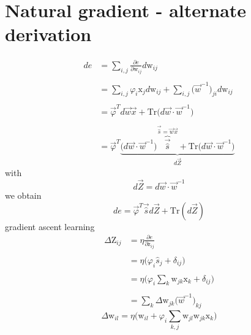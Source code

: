 \documentclass[a4paper,11pt]{article}
\begin{document}
\section{Natural gradient - alternate derivation}
\begin{equation}
	\begin{array}{ll}
	de & = \sum\limits_{i,j} \frac{\partial e}{\partial \mathrm{w}_{ij}}
		d \mathrm{w}_{ij} \\\\
	& = \sum\limits_{i,j} \varphi_i \mathrm{x}_j d \mathrm{w}_{ij} + 
		\sum\limits_{i,j} \big( \vec{w}^{-1} \big)_{ji} d 
		\mathrm{w}_{ij} \\\\
	& = \vec{\varphi}^T d \vec{w} \vec{x} + \mathrm{Tr} \big(
		d \vec{w} \cdot \vec{w}^{-1} \big) \\\\
	& = \vec{\varphi}^T 
		\underbrace{ \big( d \vec{w} \cdot \vec{w}^{-1} \big) 
		\overbrace{ \vec{\widehat{s}} }^{\vec{\widehat{s}} = \vec{w}
			\vec{x}}
		+ \mathrm{Tr} \big( d \vec{w} \cdot
		\vec{w}^{-1} \big) }_{d \vec{Z}}
	\end{array}
\end{equation}
with 
\begin{equation}
	d \vec{Z} = d \vec{w} \cdot \vec{w}^{-1} 
\end{equation}
we obtain
\begin{equation}
	de = \vec{\varphi}^T \vec{\widehat{s}} d \vec{Z} + \mathrm{Tr}(d\vec{Z})
\end{equation}
gradient ascent learning
\begin{equation}
	\begin{array}{ll}
	\Delta \mathrm{Z}_{ij} & = \eta \frac{\partial e}
		{\partial \mathrm{z}_{ij}} \\\\
	& = \eta \big( \varphi_i \widehat{s}_j + \delta_{ij} \big) \\\\
	& = \eta \Big( \varphi_i \sum\limits_k \mathrm{w}_{jk} \mathrm{x}_k
		+ \delta_{ij} \Big) \\\\
	& = \sum\limits_k \Delta \mathrm{w}_{jk} \big( \vec{w}^{-1} \big)_{kj}
	\end{array}
\end{equation}
\begin{equation}
	\Delta \mathrm{w}_{il} = \eta \Big( \mathrm{w}_{il} + \varphi_i
		\sum\limits_{k,j} \mathrm{w}_{jl} \mathrm{w}_{jk} \mathrm{x}_k
		\Big)
\end{equation}
\end{document}
